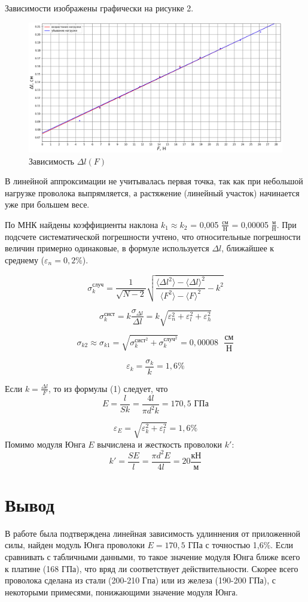 \documentclass[a4paper, 12pt]{article}
\begin{document}
Зависимости изображены графически на рисунке 2.
\begin{figure}[h]
    \centering
    \includegraphics[scale = 0.5]{plot.png}
    \caption{Зависимость $\Delta l(F)$}
    \label{fig:enter-label}
\end{figure}
 В линейной аппроксимации не учитывалась первая точка, так как при небольшой нагрузке проволока выпрямляется, а растяжение (линейный участок) начинается уже при большем весе.

По МНК найдены коэффициенты наклона $k_1 \approx k_2$ = 0,005 $\frac{\text{см}}{\text{Н}}$ = 0,00005 $\frac{\text{м}}{\text{Н}}$. При подсчете систематической погрешности учтено, что относительные погрешности величин примерно одинаковые, в формуле используется $\Delta l$, ближайшее к среднему ($\varepsilon_n = 0,2 \%$).

\[ \sigma_k^{\text{случ}} = \frac{1}{\sqrt{N - 2}}\sqrt{\frac{\langle {\Delta l}^2 \rangle -\langle {\Delta l} \rangle^2}{
    \langle F^2 \rangle - \langle F \rangle^2} - k^2}\]

\[ \sigma_k^{\text{сист}} = k\frac{\sigma_{\Delta l}}{\Delta l} = k\sqrt{\varepsilon_n^2+\varepsilon_l^2+\varepsilon_h^2}\]

\[ \sigma_{k2} \approx \sigma_{k1} = \sqrt{\sigma_k^{{\text{сист}}^2}+\sigma_k^{{\text{случ}}^2}} = 0,00008 \text{ }\frac{\text{см}}{\text{Н}}\]

\[ \varepsilon_k = \frac{\sigma_k}{k} = 1,6 \%\]
    
Если $k = \frac{\Delta l}{F}$, то из формулы (1) следует, что
\[ E = \frac{l}{Sk} = \frac{4l}{\pi d^2k} = 170,5 \text{ ГПа}\]

\[ \varepsilon_E = \sqrt{\varepsilon_k^2+\varepsilon_l^2} = 1,6 \%\]
Помимо модуля Юнга $E$ вычислена и жесткость проволоки $k'$:
\[k' = \frac{SE}{l} = \frac{\pi d^2 E}{4l} = 20 \frac{\text{кН}}{\text{м}}\]

\section{Вывод}
В работе была подтверждена линейная зависимость удлиннения от приложенной силы, найден модуль Юнга проволоки $ E = 170,5 \text{ ГПа}$ с точностью 1,6\%. Если сравнивать с табличными данными, то такое значение модуля Юнга ближе всего к платине (168 ГПа), что вряд ли соответствует действительности. Скорее всего проволока сделана из стали (200-210 Гпа) или из железа (190-200 ГПа), с некоторыми примесями, понижающими значение модуля Юнга.
\end{document}
